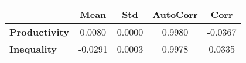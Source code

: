 \begin{tiny}\begin{tabular}{|l|c|c|c|c|}
\hline
&\textbf{Mean}&\textbf{Std}&\textbf{AutoCorr}&\textbf{Corr}\\\hline
\textbf{Productivity}&0.0080&0.0000&0.9980&-0.0367\\\hline
\textbf{Inequality}&-0.0291&0.0003&0.9978&0.0335\\\hline
\end{tabular}
\end{tiny}